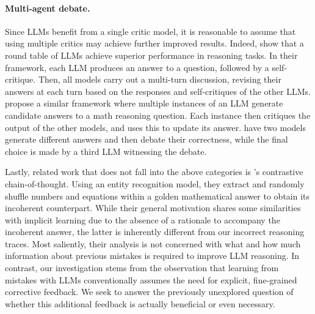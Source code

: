 \paragraph{Multi-agent debate.} Since LLMs benefit from a single critic model, it is reasonable to assume that using multiple critics may achieve further improved results. Indeed, \citet{chen-etal-2024-reconcile} show that a round table of LLMs achieve superior performance in reasoning tasks. In their framework, each LLM produces an answer to a question, followed by a self-critique. Then, all models carry out a multi-turn discussion, revising their answers at each turn based on the responses and self-critiques of the other LLMs. \citet{du2023improvingfactualityreasoninglanguage} propose a similar framework where multiple instances of an LLM generate candidate answers to a math reasoning question. Each instance then critiques the output of the other models, and uses this to update its answer. \citet{khan2024debating} have two models generate different answers and then debate their correctness, while the final choice is made by a third LLM witnessing the debate. 

\vspace{6pt}

Lastly, related work that does not fall into the above categories is \citet{chia2023contrastivechainofthoughtprompting}'s contrastive chain-of-thought. Using an entity recognition model, they extract and randomly shuffle numbers and equations within a golden mathematical answer to obtain its incoherent counterpart. While their general motivation shares some similarities with implicit learning due to the absence of a rationale to accompany the incoherent answer, the latter is inherently different from our incorrect reasoning traces. Most saliently, their analysis is not concerned with what and how much information about previous mistakes is required to improve LLM reasoning. In contrast, our investigation stems from the observation that learning from mistakes with LLMs conventionally assumes the need for explicit, fine-grained corrective feedback. We seek to answer the previously unexplored question of whether this additional feedback is actually beneficial or even necessary.